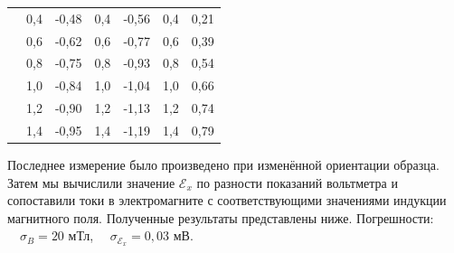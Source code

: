 \begin{longtable}[c]{l|rr|rr|rr|}
		& \multicolumn{1}{r|}{0,4}            & -0,48  & \multicolumn{1}{r|}{0,4}            & -0,56  & \multicolumn{1}{r|}{0,4}            & 0,21   \\ \cline{2-7} 
		& \multicolumn{1}{r|}{0,6}            & -0,62  & \multicolumn{1}{r|}{0,6}            & -0,77  & \multicolumn{1}{r|}{0,6}            & 0,39   \\ \cline{2-7} 
		& \multicolumn{1}{r|}{0,8}            & -0,75  & \multicolumn{1}{r|}{0,8}            & -0,93  & \multicolumn{1}{r|}{0,8}            & 0,54   \\ \cline{2-7} 
		& \multicolumn{1}{r|}{1,0}            & -0,84  & \multicolumn{1}{r|}{1,0}            & -1,04  & \multicolumn{1}{r|}{1,0}            & 0,66   \\ \cline{2-7} 
		& \multicolumn{1}{r|}{1,2}            & -0,90  & \multicolumn{1}{r|}{1,2}            & -1,13  & \multicolumn{1}{r|}{1,2}            & 0,74   \\ \cline{2-7} 
		& \multicolumn{1}{r|}{1,4}            & -0,95  & \multicolumn{1}{r|}{1,4}            & -1,19  & \multicolumn{1}{r|}{1,4}            & 0,79   \\ \cline{2-7} 
\end{longtable}
\n
Последнее измерение было произведено при изменённой ориентации образца. Затем мы вычислили значение $ \mathcal{E}_x $ по разности показаний вольтметра и сопоставили токи в электромагните с соответствующими значениями индукции магнитного поля. Полученные результаты представлены ниже. Погрешности: $\quad \sigma_{B} = 20$ мТл, $\quad \sigma_{\mathcal{E}_x} = 0,03$ мВ.

